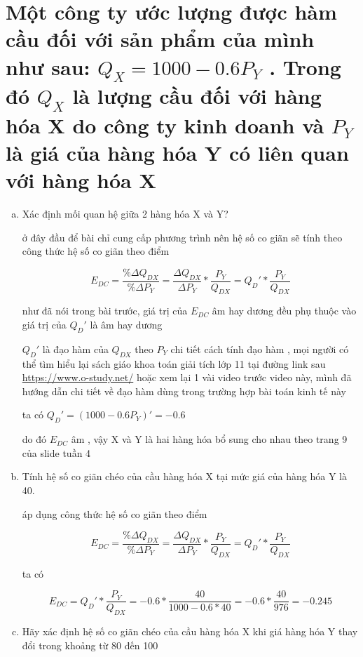 \section{ Một công ty ước lượng được hàm cầu đối với sản phẩm của mình như sau:
  $Q_X = 1000 - 0.6P_Y$ . Trong đó $Q_X$ là lượng cầu đối với hàng hóa X do công ty kinh doanh và $P_Y$ là giá của hàng hóa Y có liên quan với hàng hóa X}


\begin{enumerate}[a.]
  \item Xác định mối quan hệ giữa 2 hàng hóa X và Y?

        ở đây đầu để bài chỉ cung cấp phương trình nên hệ số co giãn sẽ tính theo công thức
        hệ số co giãn theo điểm

        \[ E_{DC} = \frac{\% \Delta Q_{DX}}{\% \Delta P_{Y}}
          =  \frac{ \Delta Q_{DX}}{\Delta P_{Y}} * \frac{P_{Y}}{Q_{DX}}
          = Q_D' *  \frac{P_{Y}}{Q_{DX}} \]

        như đã nói trong bài trước, giá trị của $E_{DC}$ âm hay dương đều phụ thuộc vào giá trị của $Q_D'$ là âm hay dương

        $Q_D'$ là đạo hàm của $Q_{DX}$ theo $P_Y$  chi tiết cách tính đạo hàm , mọi người có thể tìm hiểu lại sách giáo khoa toán giải tích lớp 11 tại đường link sau \url{https://www.o-study.net/} hoặc xem lại 1 vài video trước video này, mình đã hướng dẫn chi tiết về đạo hàm dùng trong trường hợp bài toán kinh tế này

        ta có $Q_D' = (1000 - 0.6P_Y)' = -0.6$

        do đó $E_{DC}$ âm , vậy X và Y là hai hàng hóa bổ sung cho nhau theo trang 9 của slide tuần 4

  \item Tính hệ số co giãn chéo của cầu hàng hóa X tại mức giá của hàng hóa Y là 40.

        áp dụng công thức hệ số co giãn theo điểm

        \[ E_{DC} = \frac{\% \Delta Q_{DX}}{\% \Delta P_{Y}}
          =  \frac{ \Delta Q_{DX}}{\Delta P_{Y}} * \frac{P_{Y}}{Q_{DX}}
          = Q_D' *  \frac{P_{Y}}{Q_{DX}} \]

        ta có

        \[ E_{DC} = Q_D' *  \frac{P_{Y}}{Q_{DX}}
          = -0.6 *  \frac{40}{1000 - 0.6 * 40}
          = -0.6 * \frac{40}{976} = -0.245 \]

  \item Hãy xác định hệ số co giãn chéo của cầu hàng hóa X khi giá hàng hóa Y thay đổi
        trong khoảng từ 80 đến 100


\end{enumerate}
